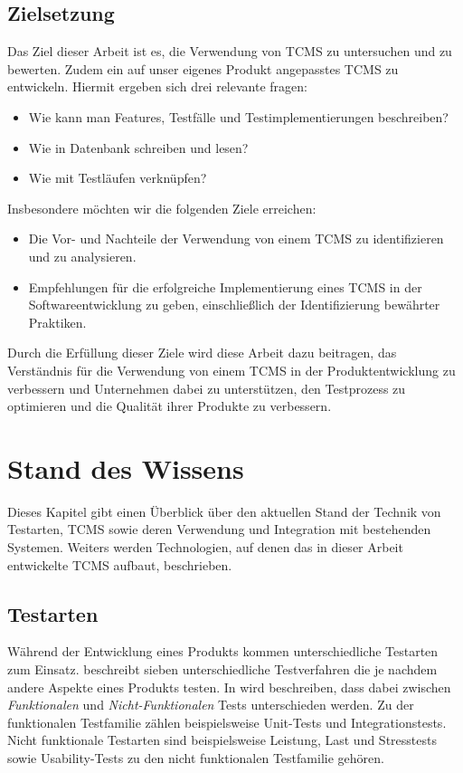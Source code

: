 \documentclass[a4paper, fontsize=11pt, parskip=half, twoside]{scrreprt}
\begin{document}
	\section{Zielsetzung}
	Das Ziel dieser Arbeit ist es, die Verwendung von \ac{TCMS} zu untersuchen und zu bewerten. 
	Zudem ein auf unser eigenes Produkt angepasstes \ac{TCMS} zu entwickeln. 
	Hiermit ergeben sich drei relevante fragen:
	
	\begin{itemize}
		\item Wie kann man Features, Testfälle und Testimplementierungen beschreiben? 
		\item Wie in Datenbank schreiben und lesen? 
		\item Wie mit Testläufen verknüpfen?
	\end{itemize}
	
	Insbesondere möchten wir die folgenden Ziele erreichen:
	
	\begin{itemize}
		\item Die Vor- und Nachteile der Verwendung von einem \ac{TCMS} zu identifizieren und zu analysieren.
		\item Empfehlungen für die erfolgreiche Implementierung eines \ac{TCMS} in der Softwareentwicklung zu geben, einschließlich der Identifizierung bewährter Praktiken.
	\end{itemize}
	
	Durch die Erfüllung dieser Ziele wird diese Arbeit dazu beitragen, das Verständnis für die Verwendung von einem \ac{TCMS} in der Produktentwicklung zu verbessern und Unternehmen dabei zu unterstützen, den Testprozess zu optimieren und die Qualität ihrer Produkte zu verbessern.
	
	
	
	\chapter{Stand des Wissens}
	Dieses Kapitel gibt einen Überblick über den aktuellen Stand der Technik von Testarten, \ac{TCMS} sowie deren Verwendung und Integration mit bestehenden Systemen. 
	Weiters werden Technologien, auf denen das in dieser Arbeit entwickelte \ac{TCMS} aufbaut, beschrieben.
	
	\section{Testarten} \label{sec:testtypes}
	Während der Entwicklung eines Produkts kommen unterschiedliche Testarten zum Einsatz. 
	\textcite{atlassian_unterschiedlichen_nodate} beschreibt sieben unterschiedliche Testverfahren die je nachdem andere Aspekte eines Produkts testen.
	In \textcite{noauthor_software_nodate} wird beschreiben, dass dabei zwischen \emph{Funktionalen} und \emph{Nicht-Funktionalen} Tests unterschieden werden.
	Zu der funktionalen Testfamilie zählen beispielsweise Unit-Tests und Integrationstests.
	Nicht funktionale Testarten sind beispielsweise Leistung, Last und Stresstests sowie Usability-Tests zu den nicht funktionalen Testfamilie gehören.
	
\end{document}
